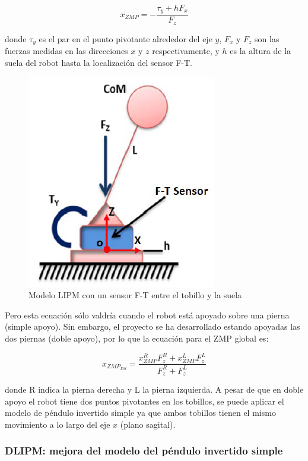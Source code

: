\begin{equation}
x_{ZMP}=-\frac{\tau_y + h F_x}{F_z}
\label{ec422}
\end{equation}

donde $\tau_y$ es el par en el punto pivotante alrededor del eje $y$, $F_x$ y $F_z$ son las fuerzas medidas en las direcciones $x$ y $z$ respectivamente, y $h$ es la altura de la suela del robot hasta la localización del sensor F-T.

\begin{figure}[H]
\centering
\includegraphics[scale=0.8]{imagenes/apartado_4/44_LIPM_TEO}
\caption{Modelo LIPM con un sensor F-T entre el tobillo y la suela}
\label{figura44}
\end{figure}

Pero esta ecuación sólo valdría cuando el robot está apoyado sobre una pierna (simple apoyo). Sin embargo, el proyecto se ha desarrollado estando apoyadas las dos piernas (doble apoyo), por lo que la ecuación para el ZMP global es:


\begin{equation}
x_{ZMP_{DS}}=\frac{x_{ZMP}^{R}F_{z}^{R}+x_{ZMP}^{L}F_{z}^{L}}{F_{z}^{R}+F_{z}^{L}}
\label{ec423}
\end{equation}

donde R indica la pierna derecha y L la pierna izquierda. A pesar de que en doble apoyo el robot tiene dos puntos pivotantes en los tobillos, se puede aplicar el modelo de péndulo invertido simple ya que ambos tobillos tienen el mismo movimiento a lo largo del eje $x$ (plano sagital).

\subsubsection{DLIPM: mejora del modelo del péndulo invertido simple}\label{definicionDLIPM}

